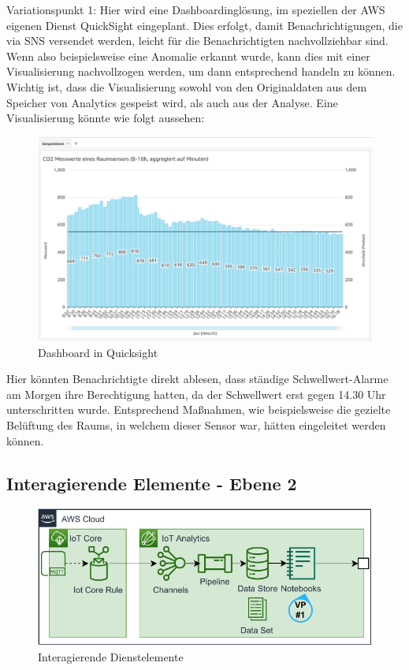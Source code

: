 Variationspunkt 1: Hier wird eine Dashboardinglösung, im speziellen der \ac{AWS} eigenen Dienst QuickSight eingeplant. Dies erfolgt, damit Benachrichtigungen, die via \ac{SNS} versendet werden, leicht für die Benachrichtigten nachvollziehbar sind. Wenn also beispielsweise eine Anomalie erkannt wurde, kann dies mit einer Visualisierung nachvollzogen werden, um dann entsprechend handeln zu können. Wichtig ist, dass die Visualisierung sowohl von den Originaldaten aus dem Speicher von \AWSIOT{} Analytics gespeist wird, als auch aus der Analyse. Eine Visualisierung könnte wie folgt aussehen:

\begin{figure}[H]
\centering
\includegraphics[width=\textwidth]{graphics/QuickSight-Beispiel.png}
\caption{Dashboard in Quicksight}
\label{abb:DashboardDBRA}
\end{figure}

Hier könnten Benachrichtigte direkt ablesen, dass ständige Schwellwert-Alarme am Morgen ihre Berechtigung hatten, da der Schwellwert erst gegen 14.30 Uhr unterschritten wurde. Entsprechend Maßnahmen, wie beispielsweise die gezielte Belüftung des Raums, in welchem dieser Sensor war, hätten eingeleitet werden können.

\subsection{Interagierende Elemente - Ebene 2}
\begin{figure}[H]
\centering
\includegraphics[width=\textwidth]{graphics/DB-RA-Elements.pdf}
\caption{Interagierende Dienstelemente}
\label{abb:ElementeDBRA}
\end{figure}

